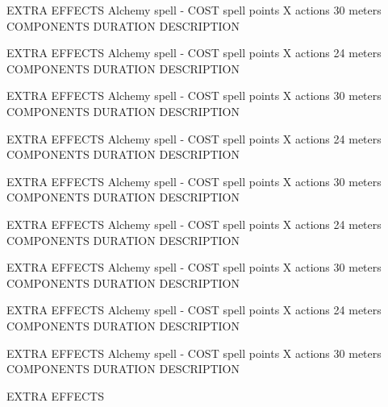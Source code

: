         EXTRA EFFECTS
        {Alchemy spell - COST spell points}
        {X actions}
        {30 meters}
        {COMPONENTS}
        {DURATION}
        DESCRIPTION

        EXTRA EFFECTS
        {Alchemy spell - COST spell points}
        {X actions}
        {24 meters}
        {COMPONENTS}
        {DURATION}
        DESCRIPTION

        EXTRA EFFECTS
        {Alchemy spell - COST spell points}
        {X actions}
        {30 meters}
        {COMPONENTS}
        {DURATION}
        DESCRIPTION

        EXTRA EFFECTS
        {Alchemy spell - COST spell points}
        {X actions}
        {24 meters}
        {COMPONENTS}
        {DURATION}
        DESCRIPTION

        EXTRA EFFECTS
        {Alchemy spell - COST spell points}
        {X actions}
        {30 meters}
        {COMPONENTS}
        {DURATION}
        DESCRIPTION

        EXTRA EFFECTS
        {Alchemy spell - COST spell points}
        {X actions}
        {24 meters}
        {COMPONENTS}
        {DURATION}
        DESCRIPTION

        EXTRA EFFECTS
        {Alchemy spell - COST spell points}
        {X actions}
        {30 meters}
        {COMPONENTS}
        {DURATION}
        DESCRIPTION

        EXTRA EFFECTS
        {Alchemy spell - COST spell points}
        {X actions}
        {24 meters}
        {COMPONENTS}
        {DURATION}
        DESCRIPTION

        EXTRA EFFECTS
        {Alchemy spell - COST spell points}
        {X actions}
        {30 meters}
        {COMPONENTS}
        {DURATION}
        DESCRIPTION

        EXTRA EFFECTS
